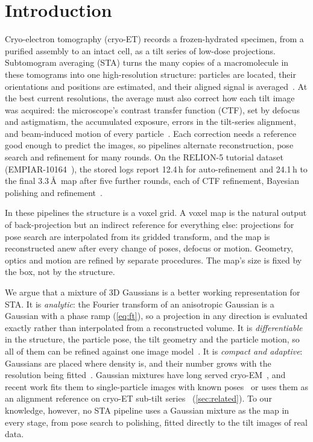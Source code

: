 \section{Introduction}
\label{sec:intro}

Cryo-electron tomography (cryo-ET) records a frozen-hydrated specimen, from a purified assembly to an intact cell, as a tilt series of low-dose projections.
Subtomogram averaging (STA) turns the many copies of a macromolecule in these tomograms into one high-resolution structure: particles are located, their orientations and positions are estimated, and their aligned signal is averaged~\cite{castanodiez2012dynamo,himes2018emclarity,chen2019eman2,tegunov2021m,zivanov2022relion4,burt2024relion5}.
At the best current resolutions, the average must also correct how each tilt image was acquired: the microscope's contrast transfer function (CTF), set by defocus and astigmatism, the accumulated exposure, errors in the tilt-series alignment, and beam-induced motion of every particle~\cite{grant2015dose,zivanov2019polishing,tegunov2021m}.
Each correction needs a reference good enough to predict the images, so pipelines alternate reconstruction, pose search and refinement for many rounds.
On the RELION-5 tutorial dataset (EMPIAR-10164~\cite{schur2016hiv,iudin2023empiar}), the stored logs report 12.4\,h for auto-refinement and 24.1\,h to the final 3.3\,\AA\ map after five further rounds, each of CTF refinement, Bayesian polishing and refinement~\cite{burt2024relion5}.

In these pipelines the structure is a voxel grid.
A voxel map is the natural output of back-projection but an indirect reference for everything else: projections for pose search are interpolated from its gridded transform, and the map is reconstructed anew after every change of poses, defocus or motion.
Geometry, optics and motion are refined by separate procedures.
The map's size is fixed by the box, not by the structure.

We argue that a mixture of 3D Gaussians is a better working representation for STA.
It is \emph{analytic}: the Fourier transform of an anisotropic Gaussian is a Gaussian with a phase ramp (\cref{eq:ft}), so a projection in any direction is evaluated exactly rather than interpolated from a reconstructed volume.
It is \emph{differentiable} in the structure, the particle pose, the tilt geometry and the particle motion, so all of them can be refined against one image model~\cite{kerbl2023gaussian,chen2021e2gmm}.
It is \emph{compact and adaptive}: Gaussians are placed where density is, and their number grows with the resolution being fitted~\cite{kerbl2023gaussian}.
Gaussian mixtures have long served cryo-EM~\cite{kawabata2008gmm,joubert2015gmm,chen2021e2gmm}, and recent work fits them to single-particle images with known poses~\cite{chen2026cryosplat,qu2025gem} or uses them as an alignment reference on cryo-ET sub-tilt series~\cite{chen2026gmmfocused} (\cref{sec:related}).
To our knowledge, however, no STA pipeline uses a Gaussian mixture as the map in every stage, from pose search to polishing, fitted directly to the tilt images of real data.

